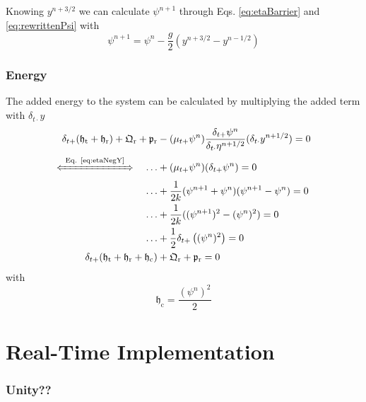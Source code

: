 Knowing $y^{n+3/2}$ we can calculate $\psi^{n+1}$ through Eqs. \eqref{eq:etaBarrier} and \eqref{eq:rewrittenPsi} with
\begin{equation}\label{eq:psiUpdate}
    \psi^{n+1} = \psi^n - \frac{g}{2}\left(y^{n+3/2} - y^{n-1/2}\right)
\end{equation}
\subsubsection{Energy}
The added energy to the system can be calculated by multiplying the added term with $\delta_{t\cdot}y$
\begin{align}
    \delta_{t+}(\mathfrak{h}_\text{t}+\mathfrak{h}_\text{r}) + \mathfrak{Q}_\text{r} + \mathfrak{p}_\text{r}&-(\mu_{t+}\psi^n) \frac{\delta_{t+}\psi^n}{\delta_{t\cdot}\eta^{n+1/2}}(\delta_{t\cdot}y^{n+1/2}) = 0\nonumber\\[-5pt]
    \xLeftrightarrow{\mystrut\ \text{Eq. \eqref{eq:etaNegY}}\ }\quad \hdots &+ (\mu_{t+}\psi^n) (\delta_{t+}\psi^n) = 0\nonumber\\
    \hdots &+ \frac{1}{2k}(\psi^{n+1}+\psi^n)(\psi^{n+1} - \psi^n)=0\nonumber\\
    \hdots  &+\frac{1}{2k}((\psi^{n+1})^2 - (\psi^n)^2)=0\nonumber\\
    \hdots &+ \frac{1}{2}\delta_{t+}\left((\psi^n)^2\right) = 0\nonumber\\
    \delta_{t+}(\mathfrak{h}_\text{t}+\mathfrak{h}_\text{r} + \mathfrak{h}_\text{c}) &+ \mathfrak{Q}_\text{r} + \mathfrak{p}_\text{r} = 0
\end{align}
with
\begin{equation}
    \mathfrak{h}_\text{c} = \frac{(\psi^n)^2}{2 }\nonumber
\end{equation}
\section{Real-Time Implementation}
\subsubsection{Unity??}


